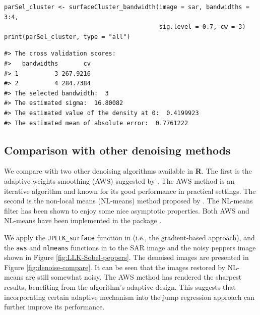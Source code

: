 \begin{verbatim}
parSel_cluster <- surfaceCluster_bandwidth(image = sar, bandwidths = 3:4, 
                                           sig.level = 0.7, cw = 3)
print(parSel_cluster, type = "all")
\end{verbatim}

\begin{verbatim}
#> The cross validation scores:
#>   bandwidths       cv
#> 1          3 267.9216
#> 2          4 284.7384
#> The selected bandwidth:  3 
#> The estimated sigma:  16.80082 
#> The estimated value of the density at 0:  0.4199923 
#> The estimated mean of absolute error:  0.7761222
\end{verbatim}

\subsection{\texorpdfstring{{Comparison with other denoising methods}}{Comparison with other denoising methods}}\label{sec:denoise.compare}

We compare with two other denoising algorithms available in \textbf{R}. The first is the adaptive weights smoothing (AWS) suggested by \citet{polzehl2000adaptive}. The AWS method is an iterative algorithm and known for its good performance in practical settings. The second is the non-local means (NL-means) method proposed by \citet{buades2005review}. The NL-means filter has been shown to enjoy some nice asymptotic properties. Both AWS and NL-means have been implemented in the package  \citep{polzehl2023magnetic, polzehl2020patch}.

We apply the \texttt{JPLLK\_surface} function in  (i.e., the gradient-based approach), and the \texttt{aws} and \texttt{nlmeans} functions in  to the SAR image and the noisy peppers image shown in Figure \ref{fig:LLK-Sobel-peppers}. The denoised images are presented in Figure \ref{fig:denoise-compare}. It can be seen that the images restored by NL-means are still somewhat noisy. The AWS method has rendered the sharpest results, benefiting from the algorithm's adaptive design. This suggests that incorporating certain adaptive mechanism into the jump regression approach can further improve its performance.



